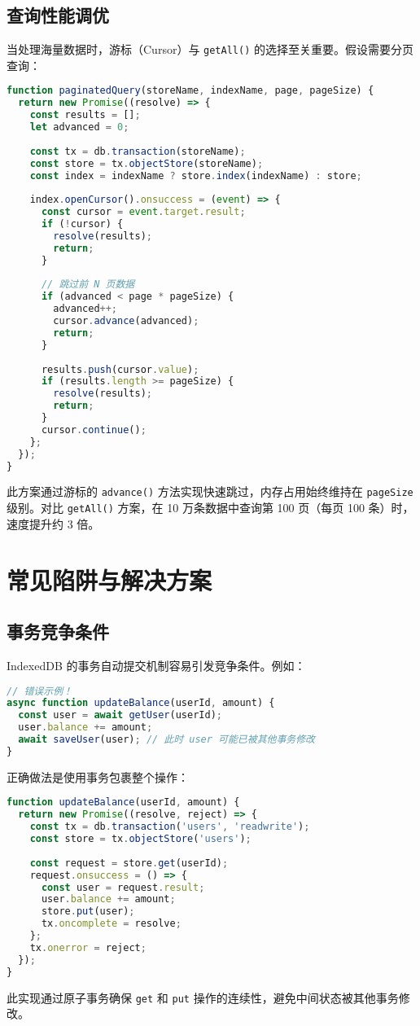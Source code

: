 \section{查询性能调优}
当处理海量数据时，游标（Cursor）与 \verb!getAll()! 的选择至关重要。假设需要分页查询：\par
\begin{lstlisting}[language=javascript]
function paginatedQuery(storeName, indexName, page, pageSize) {
  return new Promise((resolve) => {
    const results = [];
    let advanced = 0;
    
    const tx = db.transaction(storeName);
    const store = tx.objectStore(storeName);
    const index = indexName ? store.index(indexName) : store;
    
    index.openCursor().onsuccess = (event) => {
      const cursor = event.target.result;
      if (!cursor) {
        resolve(results);
        return;
      }
      
      // 跳过前 N 页数据
      if (advanced < page * pageSize) {
        advanced++;
        cursor.advance(advanced);
        return;
      }
      
      results.push(cursor.value);
      if (results.length >= pageSize) {
        resolve(results);
        return;
      }
      cursor.continue();
    };
  });
}
\end{lstlisting}
此方案通过游标的 \verb!advance()! 方法实现快速跳过，内存占用始终维持在 \verb!pageSize! 级别。对比 \verb!getAll()! 方案，在 10 万条数据中查询第 100 页（每页 100 条）时，速度提升约 3 倍。\par
\chapter{常见陷阱与解决方案}
\section{事务竞争条件}
IndexedDB 的事务自动提交机制容易引发竞争条件。例如：\par
\begin{lstlisting}[language=javascript]
// 错误示例！
async function updateBalance(userId, amount) {
  const user = await getUser(userId); 
  user.balance += amount;
  await saveUser(user); // 此时 user 可能已被其他事务修改
}
\end{lstlisting}
正确做法是使用事务包裹整个操作：\par
\begin{lstlisting}[language=javascript]
function updateBalance(userId, amount) {
  return new Promise((resolve, reject) => {
    const tx = db.transaction('users', 'readwrite');
    const store = tx.objectStore('users');
    
    const request = store.get(userId);
    request.onsuccess = () => {
      const user = request.result;
      user.balance += amount;
      store.put(user);
      tx.oncomplete = resolve;
    };
    tx.onerror = reject;
  });
}
\end{lstlisting}
此实现通过原子事务确保 \verb!get! 和 \verb!put! 操作的连续性，避免中间状态被其他事务修改。\par
